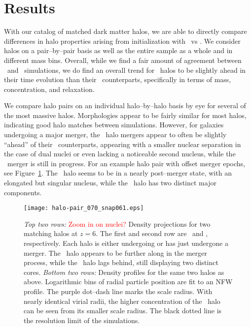 \section{Results}
\label{sec:results}

With our catalog of matched dark matter halos, we are able to directly compare differences in halo properties arising from initialization with \lpt\ vs \za.  We consider halos on a pair--by--pair basis as well as the entire sample as a whole and in different mass bins.  Overall, while we find a fair amount of agreement between \lpt\ and \za\ simulations, we do find an overall trend for \lpt\ halos to be slightly ahead in their time evolution than their \za\ counterparts, specifically in terms of mass, concentration, and relaxation.

We compare halo pairs on an individual halo--by--halo basis by eye for several of the most massive halos.  Morphologies appear to be fairly similar for most halos, indicating good halo matches between simulations.  However, for galaxies undergoing a major merger, the \lpt\ halo mergers appear to often be slightly ``ahead'' of their \za\ counterparts, appearing with a smaller nuclear separation in the case of dual nuclei or even lacking a noticeable second nucleus, while the \za\ merger is still in progress.  For an example halo pair with offset merger epochs, see Figure~\ref{fig:halo-pair}.  The \lpt\ halo seems to be in a nearly post--merger state, with an elongated but singular nucleus, while the \za\ halo has two distinct major components.

\begin{figure}[t]
	\centering
	\texttt{[image: halo-pair\_070\_snap061.eps]}
	\caption[Comparison of matched \lpt\ and \za\ halos]{\footnotesize \emph{Top two rows:}  \textcolor{red}{Zoom in on nuclei?}  Density projections for two matching halos at $z = 6$.  The first and second row are \lpt\ and \za, respectively.  Each halo is either undergoing or has just undergone a merger.  The \lpt\ halo appears to be further along in the merger process, while the \za\ halo lags behind, still displaying two distinct cores.  \emph{Bottom two rows:}  Density profiles for the same two halos as above.  Logarithmic bins of radial particle position are fit to an NFW profile.  The purple dot--dash line marks the scale radius.  With nearly identical virial radii, the higher concentration of the \lpt\ halo can be seen from its smaller scale radius.  The black dotted line is the resolution limit of the simulations.}
	\label{fig:halo-pair}
\end{figure}

